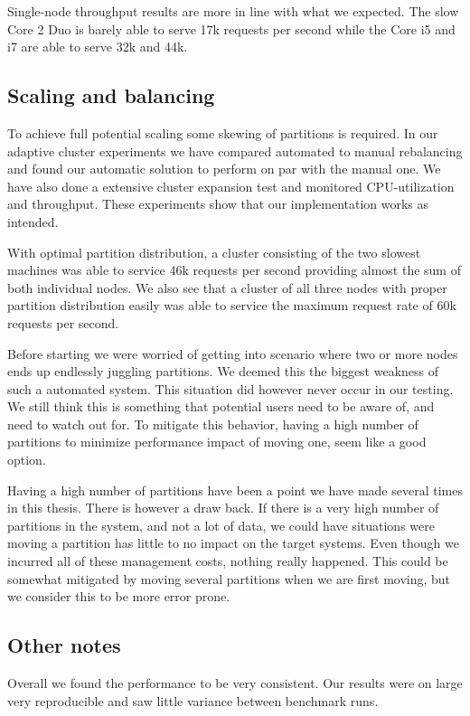 Single-node throughput results are more in line with what we expected. The slow Core 2 Duo is barely able to serve 17k requests per second while the Core i5 and i7 are able to serve 32k and 44k. 

\subsection{Scaling and balancing}
\label{eval:balance}
To achieve full potential scaling some skewing of partitions is required. In our adaptive cluster experiments we have compared automated to manual rebalancing and found our automatic solution to perform on par with the manual one. We have also done a extensive cluster expansion test and monitored CPU-utilization and throughput. These experiments show that our implementation works as intended. 

With optimal partition distribution, a cluster consisting of the two slowest machines was able to service 46k requests per second providing almost the sum of both individual nodes. We also see that a cluster of all three nodes with proper partition distribution easily was able to service the maximum request rate of 60k requests per second. 

Before starting we were worried of getting into scenario where two or more nodes ends up endlessly juggling partitions. We deemed this the biggest weakness of such a automated system. This situation did however never occur in our testing. We still think this is something that potential users need to be aware of, and need to watch out for. To mitigate this behavior, having a high number of partitions to minimize performance impact of moving one, seem like a good option.

Having a high number of partitions have been a point we have made several times in this thesis. There is however a draw back. If there is a very high number of partitions in the system, and not a lot of data, we could have situations were moving a partition has little to no impact on the target systems. Even though we incurred all of these management costs, nothing really happened. This could be somewhat mitigated by moving several partitions when we are first moving, but we consider this to be more error prone.

\subsection{Other notes}
Overall we found the performance to be very consistent. Our results were on large very reproducible and saw little variance between benchmark runs.


